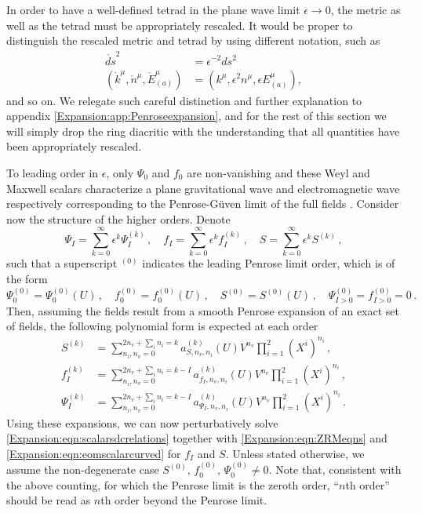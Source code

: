 In order to have a well-defined tetrad in the plane wave limit $\epsilon \to 0$, the metric as well as the tetrad
must be appropriately rescaled. It would be proper to distinguish the rescaled metric and tetrad by
using different notation, such as
\begin{align}  
\mathring{ds}^{2} &= \epsilon^{-2} ds^{2} \\
\left( \mathring{k}^{\mu}, \mathring{n}^{\mu}, \mathring{E}^{\mu}_{(a)}\right) &= \left(k^{\mu},
\epsilon^2 n^{\mu}, \epsilon E^{\mu}_{(a)}\right),
\end{align}
and so on. We relegate such careful distinction and further explanation to appendix \ref{Expansion:app:Penroseexpansion}, and for the rest of this section we will simply drop the ring diacritic with the understanding
that all quantities have been appropriately rescaled.

To leading order in $\epsilon$, only $\Psi_0$ and $f_0$ are non-vanishing and these Weyl and Maxwell scalars characterize a plane gravitational wave and electromagnetic wave respectively corresponding to the Penrose-G\"uven limit of the full fields \cite{penrose1976any,Gueven:2000ru}. Consider now the structure of the higher orders. Denote
\begin{equation}\label{Expansion:eqn:pert}
\Psi_I = \sum^{\infty}_{k=0} \epsilon^k \Psi^{(k)}_I \, , \quad f_I = \sum^{\infty}_{k=0} \epsilon^k f^{(k)}_I \, , \quad S = \sum^{\infty}_{k=0} \epsilon^k S^{(k)} \, ,
\end{equation}
such that a superscript ${}^{(0)}$ indicates the leading Penrose limit order, which is of the form \cite{Chawla:2024mse}
\begin{equation}\label{Expansion:eqn:eqnpenroselimit}
\Psi^{(0)}_{0} = 	\Psi^{(0)}_{0}(U) \, ,  \quad 	f^{(0)}_{0} = 	f^{(0)}_{0}(U) \, ,  \quad  S^{(0)} = S^{(0)}(U) \, , \quad	\Psi^{(0)}_{I>0} =  f^{(0)}_{I>0}  = 0 \, .
\end{equation}
Then, assuming the fields result from a smooth Penrose expansion of an exact set of fields, the  following polynomial form is expected at each order
\begin{align}
S^{(k)} &= \sum^{2n_v + \sum_i n_i =  k}_{n_i,n_v=0} a^{(k)}_{S,n_v, n_i}(U)  V^{n_v} \prod^2_{i=1} (X^i)^{n_i} \, , \label{Expansion:eqn:Sexpansion} \\
f^{(k)}_I &= \sum^{2n_v + \sum_i n_i =  k-I}_{n_i,n_v=0} a^{(k)}_{f_I,n_v, n_i}(U)  V^{n_v} \prod^2_{i=1} (X^i)^{n_i} \, , \label{Expansion:eqn:fexpansion} \\
\Psi^{(k)}_I &= \sum^{2n_v + \sum_i n_i =  k-I}_{n_i,n_v=0} a^{(k)}_{\Psi_I,n_v, n_i}(U)  V^{n_v} \prod^2_{i=1} (X^i)^{n_i} \, . \label{Expansion:eqn:Psiexpansion}
\end{align}
Using these expansions, we can now perturbatively solve \eqref{Expansion:eqn:scalarsdcrelations} together with \eqref{Expansion:eqn:ZRMeqns} and \eqref{Expansion:eqn:eomscalarcurved} for $f_I$ and $S$. Unless stated otherwise, we assume the non-degenerate case $S^{(0)} , \, 	f^{(0)}_{0}  , \, \Psi^{(0)}_{0} \neq 0$. Note that, consistent with the above counting, for which the Penrose limit is the zeroth order, ``$n$th order'' should be read as $n$th order beyond the Penrose limit.  

